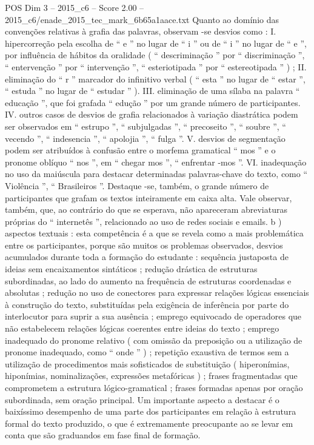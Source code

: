 \begin{textsample}{POS Dim 3 – 2015\_c6 – Score 2.00 – 2015\_c6/enade\_2015\_tec\_mark\_6b65a1aace.txt}
Quanto ao domínio das convenções relativas à grafia das palavras, observam -se desvios como : I. hipercorreção pela escolha de “ e ” no lugar de “ i ” ou de “ i ” no lugar de “ e ”, por influência de hábitos da oralidade ( “ descriminação ” por “ discriminação ”, “ entervenção ” por “ intervenção ”, “ esteriotipada ” por “ estereotipada ” ) ; II. eliminação do “ r ” marcador do infinitivo verbal ( “ esta ” no lugar de “ estar ”, “ estuda ” no lugar de “ estudar ” ).
III. eliminação de uma sílaba na palavra “ educação ”, que foi grafada “ edução ” por um grande número de participantes.
IV. outros casos de desvios de grafia relacionados à variação diastrática podem ser observados em “ estrupo ”, “ subjulgadas ”, “ precoseito ”, “ soubre ”, “ vecendo ”, “ indesencia ”, “ apolojia ”, “ fulga ”.
V. desvios de segmentação podem ser atribuídos à confusão entre o morfema gramatical “ mos ” e o pronome oblíquo “ nos ”, em “ chegar mos ”, “ enfrentar -mos ”.
VI. inadequação no uso da maiúscula para destacar determinadas palavras-chave do texto, como “ Violência ”, “ Brasileiros ”.
Destaque -se, também, o grande número de participantes que grafam os textos inteiramente em caixa alta.
Vale observar, também, que, ao contrário do que se esperava, não apareceram abreviaturas próprias do “ internetês ”, relacionado ao uso de redes sociais e emails. b ) aspectos textuais : esta competência é a que se revela como a mais problemática entre os participantes, porque são muitos os problemas observados, desvios acumulados durante toda a formação do estudante : sequência justaposta de ideias sem encaixamentos sintáticos ; redução drástica de estruturas subordinadas, ao lado do aumento na frequência de estruturas coordenadas e absolutas ; redução no uso de conectores para expressar relações lógicas essenciais à construção do texto, substituídas pela exigência de inferência por parte do interlocutor para suprir a sua ausência ; emprego equivocado de operadores que não estabelecem relações lógicas coerentes entre ideias do texto ; emprego inadequado do pronome relativo ( com omissão da preposição ou a utilização de pronome inadequado, como “ onde ” ) ; repetição exaustiva de termos sem a utilização de procedimentos mais sofisticados de substituição ( hiperonímias, hiponímias, nominalizações, expressões metafóricas ) ; frases fragmentadas que comprometem a estrutura lógico-gramatical ; frases formadas apenas por oração subordinada, sem oração principal.
Um importante aspecto a destacar é o baixíssimo desempenho de uma parte dos participantes em relação à estrutura formal do texto produzido, o que é extremamente preocupante ao se levar em conta que são graduandos em fase final de formação.

\end{textsample}
